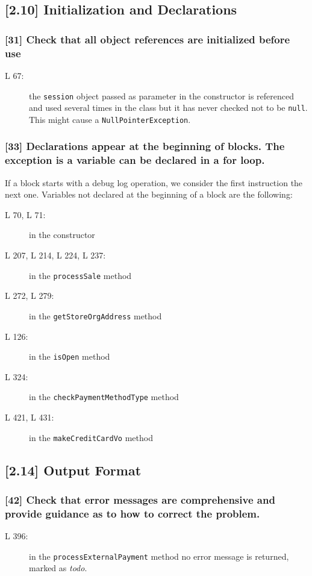 \subsection*{[2.10] Initialization and Declarations}
\subsubsection*{[31] Check that all object references are initialized before use}
\begin{description}
	\item[L 67:] the {\tt session} object passed as parameter in the constructor is referenced and used several times in the class but it has never checked not to be {\tt null}. This might cause a {\tt NullPointerException}.
\end{description} 

\subsubsection*{[33] Declarations appear at the beginning of blocks. The exception is a variable can be declared in a for loop.}
If a block starts with a debug log operation, we consider the first instruction the next one. Variables not declared at the beginning of a block are the following:
\begin{description}
	\item[L 70, L 71:] in the constructor 
	\item[L 207, L 214, L 224, L 237:] in the {\tt processSale} method 
	\item[L 272, L 279:] in the {\tt getStoreOrgAddress} method 
	\item[L 126:] in the {\tt isOpen} method 
	\item[L 324:] in the {\tt checkPaymentMethodType} method  
	\item[L 421, L 431:] in the {\tt makeCreditCardVo} method 
\end{description}

\subsection*{[2.14] Output Format}
\subsubsection*{[42] Check that error messages are comprehensive and provide guidance as to how to correct the problem.}
\begin{description}
	\item[L 396:] in the {\tt processExternalPayment} method no error message is returned, marked as \emph{todo}.
\end{description}

